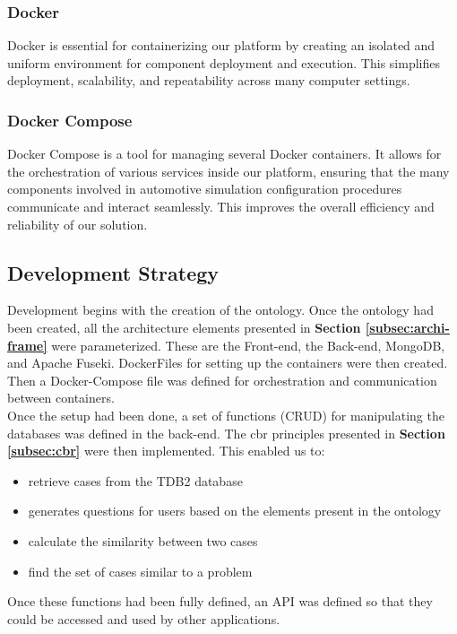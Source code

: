     \subsubsection{Docker}
    Docker is essential for containerizing our platform by creating an isolated and uniform environment for component deployment and execution. This simplifies deployment, scalability, and repeatability across many computer settings.
    
    \subsubsection{Docker Compose}
    Docker Compose is a tool for managing several Docker containers. It allows for the orchestration of various services inside our platform, ensuring that the many components involved in automotive simulation configuration procedures communicate and interact seamlessly. This improves the overall efficiency and reliability of our solution.

    
\subsection{Development Strategy}
Development begins with the creation of the ontology. Once the ontology had been created, all the architecture elements presented in \textbf{Section \ref{subsec:archi-frame}} were parameterized. These are the Front-end, the Back-end, MongoDB, and Apache Fuseki. DockerFiles for setting up the containers were then created. Then a Docker-Compose file was defined for orchestration and communication between containers.\\

Once the setup had been done, a set of functions (CRUD) for manipulating the databases was defined in the back-end. The \acrshort{cbr} principles presented in \textbf{Section \ref{subsec:cbr}} were then implemented. This enabled us to:
\begin{itemize}
    \item retrieve cases from the TDB2 database
    \item generates questions for users based on the elements present in the ontology
    \item calculate the similarity between two cases
    \item find the set of cases similar to a problem
\end{itemize}

Once these functions had been fully defined, an API was defined so that they could be accessed and used by other applications.


